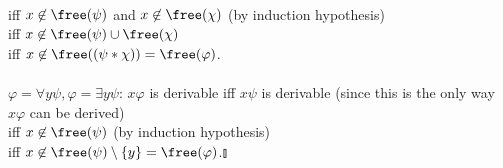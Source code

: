 \begin{enumerate}[1.]
\\iff $x \not \in \free(\psi)$ and $x \not \in \free(\chi)$ (by induction hypothesis)
\\iff $x \not \in \free(\psi) \cup \free(\chi)$
\\iff $x \not \in \free((\psi \ast \chi)) = \free(\varphi)$. \\
\ 
\\$\varphi = \forall y \psi, \varphi = \exists y \psi$: $x \varphi$ is derivable iff $x \psi$ is derivable (since this is the only way $x \varphi$ can be derived)
\\iff $x \not \in \free(\psi)$ (by induction hypothesis)
\\iff $x \not \in \free(\psi) \setminus \{ y \} = \free(\varphi)$.\nolinebreak\hfill$\talloblong$
\end{enumerate}
